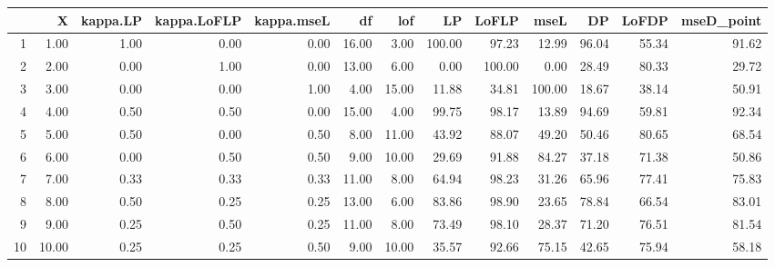 \begin{table}[ht]
\centering
\begin{tabular}{rrrrrrrrrrrrr}
  \hline
 & X & kappa.LP & kappa.LoFLP & kappa.mseL & df & lof & LP & LoFLP & mseL & DP & LoFDP & mseD\_point \\ 
  \hline
1 & 1.00 & 1.00 & 0.00 & 0.00 & 16.00 & 3.00 & 100.00 & 97.23 & 12.99 & 96.04 & 55.34 & 91.62 \\ 
  2 & 2.00 & 0.00 & 1.00 & 0.00 & 13.00 & 6.00 & 0.00 & 100.00 & 0.00 & 28.49 & 80.33 & 29.72 \\ 
  3 & 3.00 & 0.00 & 0.00 & 1.00 & 4.00 & 15.00 & 11.88 & 34.81 & 100.00 & 18.67 & 38.14 & 50.91 \\ 
  4 & 4.00 & 0.50 & 0.50 & 0.00 & 15.00 & 4.00 & 99.75 & 98.17 & 13.89 & 94.69 & 59.81 & 92.34 \\ 
  5 & 5.00 & 0.50 & 0.00 & 0.50 & 8.00 & 11.00 & 43.92 & 88.07 & 49.20 & 50.46 & 80.65 & 68.54 \\ 
  6 & 6.00 & 0.00 & 0.50 & 0.50 & 9.00 & 10.00 & 29.69 & 91.88 & 84.27 & 37.18 & 71.38 & 50.86 \\ 
  7 & 7.00 & 0.33 & 0.33 & 0.33 & 11.00 & 8.00 & 64.94 & 98.23 & 31.26 & 65.96 & 77.41 & 75.83 \\ 
  8 & 8.00 & 0.50 & 0.25 & 0.25 & 13.00 & 6.00 & 83.86 & 98.90 & 23.65 & 78.84 & 66.54 & 83.01 \\ 
  9 & 9.00 & 0.25 & 0.50 & 0.25 & 11.00 & 8.00 & 73.49 & 98.10 & 28.37 & 71.20 & 76.51 & 81.54 \\ 
  10 & 10.00 & 0.25 & 0.25 & 0.50 & 9.00 & 10.00 & 35.57 & 92.66 & 75.15 & 42.65 & 75.94 & 58.18 \\ 
   \hline
\end{tabular}
\end{table}
